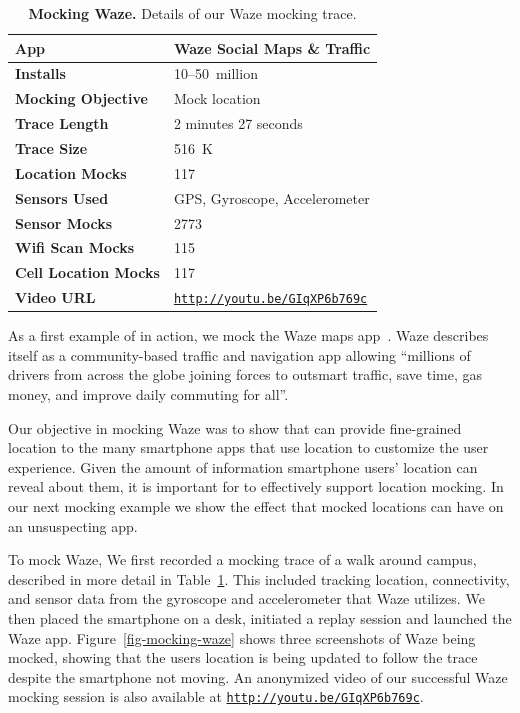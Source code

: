 \begin{table}
\begin{tabularx}{3.33in}{lX}
\textbf{App} & Waze Social Maps \& Traffic \\ \toprule
\textbf{Installs} & 10--50~million \\
\textbf{Mocking Objective} & Mock location \\ \midrule
\textbf{Trace Length} & 2 minutes 27 seconds \\
\textbf{Trace Size} & 516~K \\
\textbf{Location Mocks} & 117 \\
\textbf{Sensors Used} & {\small GPS, Gyroscope, Accelerometer} \\
\textbf{Sensor Mocks} & 2773 \\
\textbf{Wifi Scan Mocks} & 115 \\
\textbf{Cell Location Mocks} & 117 \\
\textbf{Video URL} &
\hyperlink{http://youtu.be/GIqXP6b769c}{\texttt{http://youtu.be/GIqXP6b769c}} \\

\end{tabularx}

\caption{\textbf{Mocking Waze.} Details of our Waze mocking trace.}

\label{table-mocking-waze}

\end{table}

As a first example of \PocketMocker{} in action, we mock the Waze maps
app~\cite{waze-playstore-url}. Waze describes itself as a community-based
traffic and navigation app allowing ``millions of drivers from across the
globe joining forces to outsmart traffic, save time, gas money, and improve
daily commuting for all''.

Our objective in mocking Waze was to show that \PocketMocker{} can provide
fine-grained location to the many smartphone apps that use location to
customize the user experience. Given the amount of information smartphone
users' location can reveal about them, it is important for \PocketMocker{} to
effectively support location mocking. In our next mocking example we show the
effect that mocked locations can have on an unsuspecting app.

To mock Waze, We first recorded a mocking trace of a walk around campus,
described in more detail in Table~\ref{table-mocking-waze}.  This included
tracking location, connectivity, and sensor data from the gyroscope and
accelerometer that Waze utilizes. We then placed the smartphone on a desk,
initiated a replay session and launched the Waze app.
Figure~\ref{fig-mocking-waze} shows three screenshots of Waze being mocked,
showing that the users location is being updated to follow the trace despite
the smartphone not moving. An anonymized video of our successful Waze mocking
session is also available at
\hyperlink{http://youtu.be/GIqXP6b769c}{\texttt{http://youtu.be/GIqXP6b769c}}.

